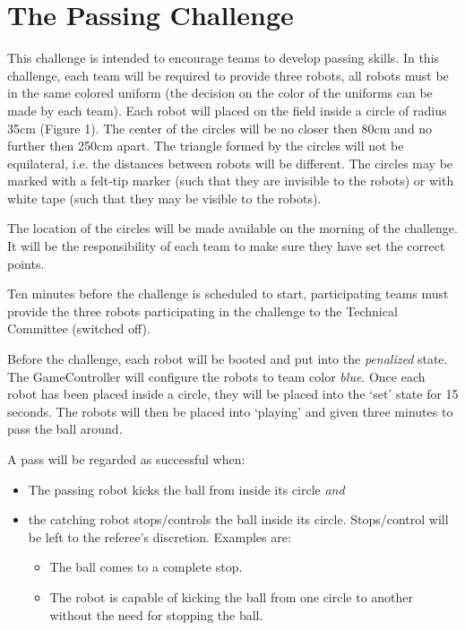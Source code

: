 \documentclass{article}
\begin{document}
\section{The Passing Challenge}
\label{sec:passing}
This challenge is intended to encourage teams to develop passing skills. In this challenge,
each team will be required to provide three robots, all robots must be in the same
colored uniform (the decision on the color of the uniforms can be made by each team).
Each robot will placed on the field inside a circle of radius 35cm (Figure 1). The center 
of the circles will be no closer then 80cm and no further then 250cm apart. The triangle formed 
by the circles will not be equilateral, i.e. the distances between robots will be different.  
The circles may be marked with a felt-tip marker (such that they are invisible to the robots) or 
with white tape (such that they may be visible to the robots).

The location of the circles will be made available on the morning of the challenge.
It will be the responsibility of each team to make sure they have set the correct points.

Ten minutes before the challenge is scheduled to start, participating teams must
provide the three robots participating in the challenge to the Technical Committee 
(switched off).

Before the challenge, each robot will be booted and put into the \emph{penalized} 
state. The GameController will configure the robots to team color \emph{blue}.  Once each 
robot has been placed inside a circle, they will be placed into the `set' state for 
15 seconds. The robots will then be placed into `playing' and given three minutes to 
pass the ball around.

A pass will be regarded as successful when:
\begin{itemize}
\item The passing robot kicks the ball from inside its circle \emph{and}
\item the catching robot stops/controls the ball inside its circle. Stops/control will be
left to the referee's discretion. Examples are:
\begin{itemize}
\item The ball comes to a complete stop.
\item The robot is capable of kicking the ball from one circle to another without the need for stopping the ball.
\end{itemize}
\end{itemize}
\end{document}
